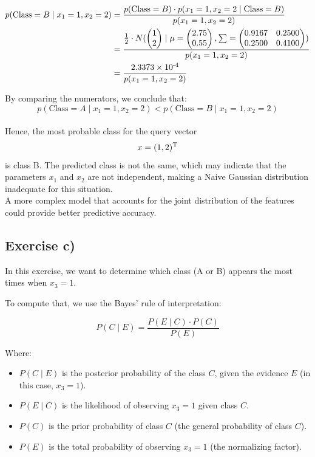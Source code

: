\documentclass{article}
\begin{document}
\begin{align*}
    p(\text{Class} = B \mid x_1 = 1, x_2 = 2) 
    &= \frac{p(\text{Class} = B) \cdot p(x_1 = 1, x_2 = 2 \mid \text{Class} = B)}{p(x_1 = 1, x_2 = 2)} \\
    &= \frac{\frac{1}{2} \cdot N(
        \begin{pmatrix}1 \\ 2\end{pmatrix} \mid
        \mu = \begin{pmatrix}2.75 \\ 0.55\end{pmatrix},
        \sum = \begin{pmatrix}0.9167 & 0.2500 \\ 0.2500 & 0.4100 \end{pmatrix}
    )}{p(x_1 = 1, x_2 = 2)} \\
    &= \frac{2.3373\times10\textsuperscript{-4}}{p(x_1 = 1, x_2 = 2)}
\end{align*}

By comparing the numerators, we conclude that:
$$p(\text{Class} = A \mid x_1 = 1, x_2 = 2) < p(\text{Class} = B \mid x_1 = 1, x_2 = 2)$$
\\
Hence, the most probable class for the query vector $$x = (1, 2)\textsuperscript{T}$$ is class B.
The predicted class is not the same, which may indicate that the parameters \(x_1\) and \(x_2\) are not independent, making a Naive Gaussian distribution inadequate for this situation.
\\
A more complex model that accounts for the joint distribution of the features could provide better predictive accuracy.

\subsection{Exercise c)}
In this exercise, we want to determine which class (A or B) appears the most times when \( x_3 = 1 \).

To compute that, we use the Bayes' rule of interpretation:

\[
P(C \mid E) = \frac{P(E \mid C) \cdot P(C)}{P(E)}
\]

Where:
\begin{itemize}
    \item \( P(C \mid E) \) is the posterior probability of the class \( C \), given the evidence \( E \) (in this case, \( x_3 = 1 \)).
    \item \( P(E \mid C) \) is the likelihood of observing \( x_3 = 1 \) given class \( C \).
    \item \( P(C) \) is the prior probability of class \( C \) (the general probability of class \( C \)).
    \item \( P(E) \) is the total probability of observing \( x_3 = 1 \) (the normalizing factor).
\end{itemize}
\end{document}

